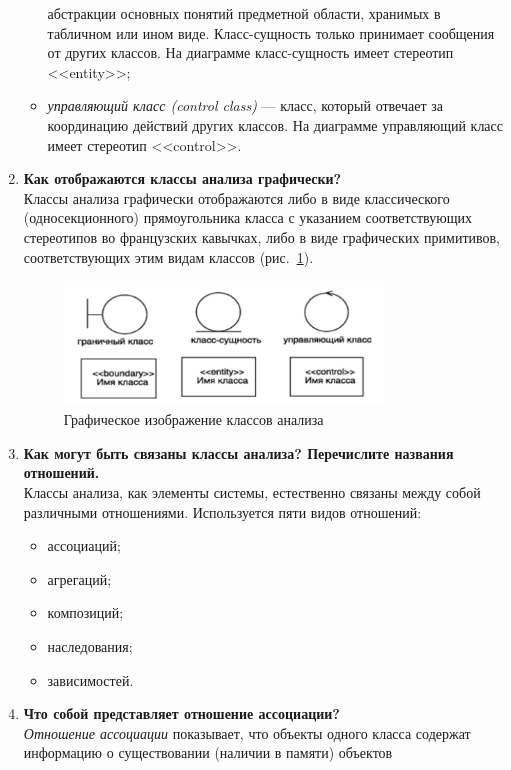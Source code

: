 \begin{enumerate}
\begin{itemize}
				абстракции основных понятий предметной области,
				хранимых в табличном или ином виде.
				Класс-сущность только принимает сообщения от других классов.
				На диаграмме класс-сущность имеет стереотип <<entity>>;
			\item \textit{управляющий класс (control class)} --- класс,
				который отвечает за координацию действий других классов.
				На диаграмме управляющий класс имеет стереотип <<control>>.
		\end{itemize}
	\item \textbf{Как отображаются классы анализа графически?}\\
		Классы анализа графически отображаются либо в виде классического
		(односекционного) прямоугольника класса с указанием соответствующих
		стереотипов во французских кавычках, либо в виде графических
		примитивов, соответствующих этим видам классов
		(рис.~\ref{fig:analysis_classes}).
		\begin{figure}[h!tp]
			\centering
			\includegraphics[width=0.8\textwidth]{Screenshot from 2023-03-01 13-33-28}
			\caption{Графическое изображение классов анализа}
			\label{fig:analysis_classes}
		\end{figure}
	\item \textbf{Как могут быть связаны классы анализа?
		Перечислите названия отношений.}\\
		Классы анализа, как элементы системы, естественно связаны между собой
различными отношениями. Используется пяти видов отношений:
		\begin{itemize}
			\item ассоциаций;
			\item агрегаций;
			\item композиций;
			\item наследования;
			\item зависимостей.
		\end{itemize}
	\item \textbf{Что собой представляет отношение ассоциации?}\\
		\textit{Отношение ассоциации} показывает, что объекты одного класса
		содержат информацию о существовании (наличии в памяти) объектов

\end{enumerate}
